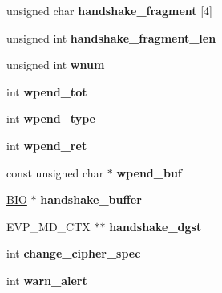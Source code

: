 \begin{DoxyCompactItemize}
\mbox{\label{structssl3__state__st_af9e35d0aec763a8d5e3b4cf618208343}} 
unsigned char {\bfseries handshake\+\_\+fragment} \mbox{[}4\mbox{]}
\item 
\mbox{\label{structssl3__state__st_aa7f770c0190a7c716ff070e3507751d6}} 
unsigned int {\bfseries handshake\+\_\+fragment\+\_\+len}
\item 
\mbox{\label{structssl3__state__st_a42c9aa8955edc0d1d23e9a82cff856c5}} 
unsigned int {\bfseries wnum}
\item 
\mbox{\label{structssl3__state__st_ab5e408a79cde9fbe60437e28f6294dc5}} 
int {\bfseries wpend\+\_\+tot}
\item 
\mbox{\label{structssl3__state__st_a9433855d8d8f5ee9e388e8ab942b6306}} 
int {\bfseries wpend\+\_\+type}
\item 
\mbox{\label{structssl3__state__st_af8b88a29b6ebc467e6754ff6505b7bd0}} 
int {\bfseries wpend\+\_\+ret}
\item 
\mbox{\label{structssl3__state__st_a99dc3475625b30f4a59507fd2260ffe3}} 
const unsigned char $\ast$ {\bfseries wpend\+\_\+buf}
\item 
\mbox{\label{structssl3__state__st_a576192e2686348c7b7b1c6cf026f2892}} 
\hyperlink{structbio__st}{B\+IO} $\ast$ {\bfseries handshake\+\_\+buffer}
\item 
\mbox{\label{structssl3__state__st_aa9d22197b1996616dea5bed29cab88b2}} 
E\+V\+P\+\_\+\+M\+D\+\_\+\+C\+TX $\ast$$\ast$ {\bfseries handshake\+\_\+dgst}
\item 
\mbox{\label{structssl3__state__st_ac0fb72191ac2a2269adf2359e8d77382}} 
int {\bfseries change\+\_\+cipher\+\_\+spec}
\item 
\mbox{\label{structssl3__state__st_ad1646ad8ddc960d735f8f9b6a3724f6b}} 
int {\bfseries warn\+\_\+alert}
\item 
$$
\end{DoxyCompactItemize}

